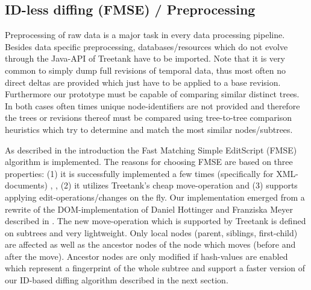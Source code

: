 

\subsection{ID-less diffing (FMSE) / Preprocessing}
Preprocessing of raw data is a major task in every data processing pipeline. Besides data specific preprocessing, databases/resources which do not evolve through the Java-API of Treetank have to be imported. Note that it is very common to simply dump full revisions of temporal data, thus most often no direct deltas are provided which just have to be applied to a base revision. Furthermore our prototype must be capable of comparing similar distinct trees. In both cases often times unique node-identifiers are not provided and therefore the trees or revisions thereof must be compared using tree-to-tree comparison heuristics which try to determine and match the most similar nodes/subtrees. %

As described in the introduction the Fast Matching Simple EditScript (FMSE) algorithm is implemented. The reasons for choosing FMSE are based on three properties: (1) it is successfully implemented a few times (specifically for XML-documents) \cite{xmldiff}, \cite{diffxml}, (2) it utilizes Treetank's cheap move-operation and (3) supports applying edit-operations/changes on the fly. Our implementation emerged from a rewrite of the DOM-implementation of Daniel Hottinger and Franziska Meyer described in \cite{diffxml}. The new move-operation which is supported by Treetank is defined on subtrees and very lightweight. Only local nodes (parent, siblings, first-child) are affected as well as the ancestor nodes of the node which moves (before and after the move). Ancestor nodes are only modified if hash-values are enabled which represent a fingerprint of the whole subtree and support a faster version of our ID-based diffing algorithm described in the next section. 

